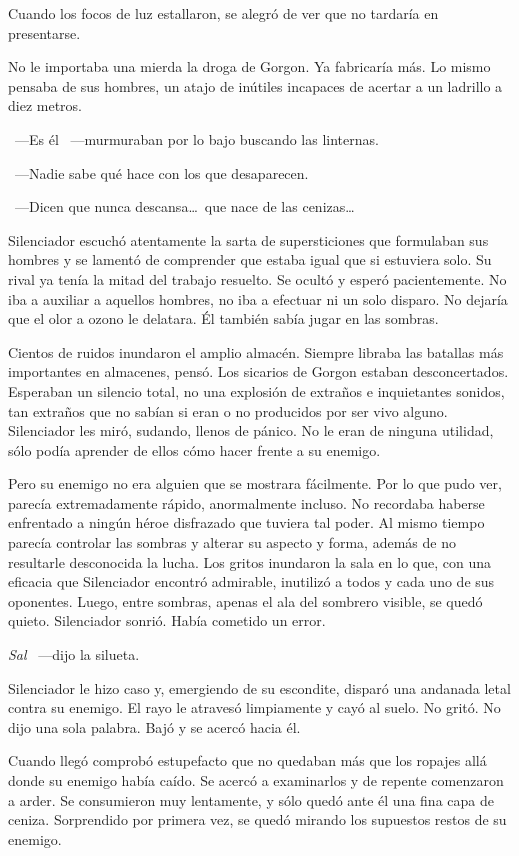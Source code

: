 Cuando los focos de luz estallaron, se alegró de ver que no tardaría en presentarse.

No le importaba una mierda la droga de Gorgon. Ya fabricaría más. Lo mismo pensaba de sus hombres, un atajo de inútiles incapaces de acertar a un ladrillo a diez metros.

~---Es él ~---murmuraban por lo bajo buscando las linternas.

~---Nadie sabe qué hace con los que desaparecen.

~---Dicen que nunca descansa\dots\ que nace de las cenizas\dots

Silenciador escuchó atentamente la sarta de supersticiones que formulaban sus hombres y se lamentó de comprender que estaba igual que si estuviera solo. Su rival ya tenía la mitad del trabajo resuelto. Se ocultó y esperó pacientemente. No iba a auxiliar a aquellos hombres, no iba a efectuar ni un solo disparo. No dejaría que el olor a ozono le delatara. Él también sabía jugar en las sombras.

Cientos de ruidos inundaron el amplio almacén. Siempre libraba las batallas más importantes en almacenes, pensó. Los sicarios de Gorgon estaban desconcertados. Esperaban un silencio total, no una explosión de extraños e inquietantes sonidos, tan extraños que no sabían si eran o no producidos por ser vivo alguno. Silenciador les miró, sudando, llenos de pánico. No le eran de ninguna utilidad, sólo podía aprender de ellos cómo hacer frente a su enemigo.

Pero su enemigo no era alguien que se mostrara fácilmente. Por lo que pudo ver, parecía extremadamente rápido, anormalmente incluso. No recordaba haberse enfrentado a ningún héroe disfrazado que tuviera tal poder. Al mismo tiempo parecía controlar las sombras y alterar su aspecto y forma, además de no resultarle desconocida la lucha. Los gritos inundaron la sala en lo que, con una eficacia que Silenciador encontró admirable, inutilizó a todos y cada uno de sus oponentes. Luego, entre sombras, apenas el ala del sombrero visible, se quedó quieto. Silenciador sonrió. Había cometido un error.

\emph{Sal} ~---dijo la silueta.

Silenciador le hizo caso y, emergiendo de su escondite, disparó una andanada letal contra su enemigo. El rayo le atravesó limpiamente y cayó al suelo. No gritó. No dijo una sola palabra. Bajó y se acercó hacia él.

Cuando llegó comprobó estupefacto que no quedaban más que los ropajes allá donde su enemigo había caído. Se acercó a examinarlos y de repente comenzaron a arder. Se consumieron muy lentamente, y sólo quedó ante él una fina capa de ceniza. Sorprendido por primera vez, se quedó mirando los supuestos restos de su enemigo.

